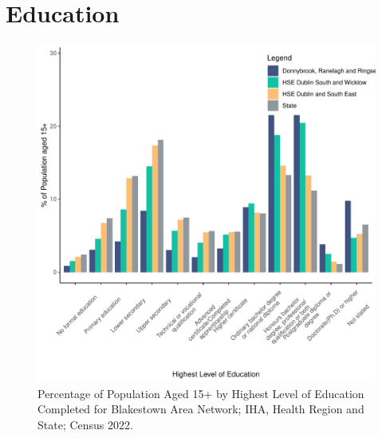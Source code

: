 \documentclass{article}
\begin{document}
\section{Education}\label{sect:Edu}
\begin{figure}[H]
	\centering
	\includegraphics[width = 120mm]{../figures/EduED.pdf}
	\caption{Percentage of Population Aged 15+ by Highest Level of Education Completed for Blakestown Area Network; IHA, Health Region and State; Census 2022.}
	\label{fig:vbnv}
	\end{figure}
\end{document}
